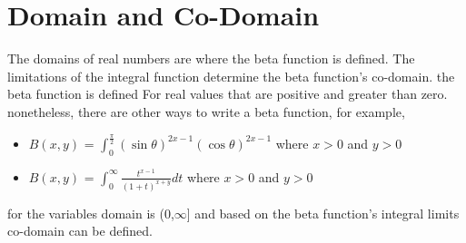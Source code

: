 \documentclass[a4paper, 12pt]{article}
\begin{document}
\section{Domain and Co-Domain}
The domains of real numbers are where the beta function is defined. The limitations of the integral function determine the beta function's co-domain. the beta function is defined For real values that are positive and greater than zero. nonetheless, there are other ways to write a beta function, for example, \\
    \begin{itemize}
        \item $B(x,y)$ = $\int_{0}^{\frac{\pi}{2}} (\sin \theta)^{2x-1} (\cos \theta)^{2x-1}$ where $x>0$ and $y>0$
        \item $B(x,y)$ = $\int_{0}^{\infty} \frac{t^{x-1}}{(1+t)^{x+y}} dt$  where $x>0$ and $y>0$
    \end{itemize}
for the variables domain is (0,${\infty}$] and based on the beta function's integral limits co-domain can be defined.\\
\end{document}
